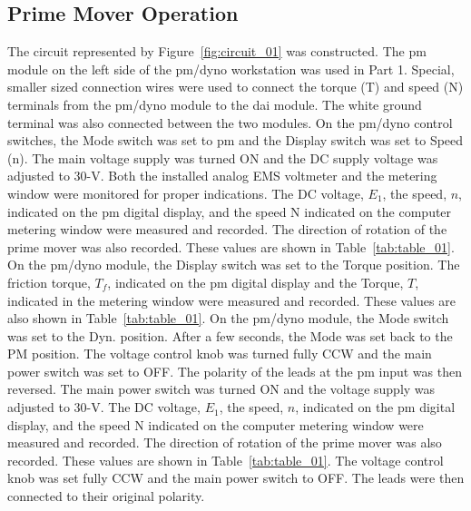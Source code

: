 \documentclass{article}
\begin{document}
\subsection{Prime Mover Operation}

\label{part1} The circuit represented by Figure~\ref{fig:circuit_01} was
constructed. The \gls{pm} module on the left side of the \gls{pm}/\gls{dyno}
workstation was used in Part 1. Special, smaller sized connection wires were
used to connect the torque (T) and speed (N) terminals from the
\gls{pm}/\gls{dyno} module to the \gls{dai} module. The white ground terminal
was also connected between the two modules. On the \gls{pm}/\gls{dyno} control
switches, the Mode switch was set to \gls{pm} and the Display switch was set to
Speed (n).  The main voltage supply was turned ON and the DC supply voltage was
adjusted to 30-V. Both the installed analog EMS voltmeter and the metering
window were monitored for proper indications. The DC voltage, $E_1$, the speed,
$n$, indicated on the \gls{pm} digital display, and the speed N indicated on
the computer metering window were measured and recorded. The direction of
rotation of the prime mover was also recorded. These values are shown in
Table~\ref{tab:table_01}. On the \gls{pm}/\gls{dyno} module, the Display switch
was set to the Torque position.  The friction torque, $T_f$, indicated on the
\gls{pm} digital display and the Torque, $T$, indicated in the metering window
were measured and recorded. These values are also shown in
Table~\ref{tab:table_01}.  On the \gls{pm}/\gls{dyno} module, the Mode switch
was set to the {Dyn}. position. After a few seconds, the Mode was set back to
the PM position. The voltage control knob was turned fully CCW and the main
power switch was set to {OFF}.  The polarity of the leads at the \gls{pm} input
was then reversed. The main power switch was turned ON and the voltage supply
was adjusted to 30-V. The DC voltage, $E_1$, the speed, $n$, indicated on the
\gls{pm} digital display, and the speed N indicated on the computer metering
window were measured and recorded. The direction of rotation of the prime mover
was also recorded. These values are shown in Table~\ref{tab:table_01}. The
voltage control knob was set fully CCW and the main power switch to {OFF}. The
leads were then connected to their original polarity.
\end{document}
